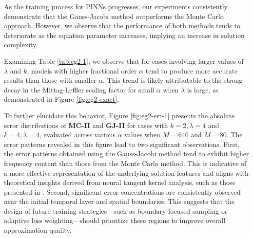 \documentclass[preprint,3p,times]{elsarticle}
\begin{document}
As the training process for PINNs progresses, our experiments consistently demonstrate that the Gauss-Jacobi method outperforms the Monte Carlo approach. However, we observe that the performance of both methods tends to deteriorate as the equation parameter increases, implying an increase in solution complexity.

Examining Table \ref{tab:eg2-1}, we observe that for cases involving larger values of $\lambda$ and $k$, models with higher fractional order $\alpha$ tend to produce more accurate results than those with smaller $\alpha$. This trend is likely attributable to the strong decay in the Mittag-Leffler scaling factor for small $\alpha$ when $\lambda$ is large, as demonstrated in Figure \ref{fig:eg2-exact}.

To further elucidate this behavior, Figure \ref{fig:eg2-err-1} presents the absolute error distributions of \textbf{MC-II} and \textbf{GJ-II} for cases with $k=2, \lambda=4$ and $k=4, \lambda=4$, evaluated across various $\alpha$ values when $M=640$ and $M=80$. The error patterns revealed in this figure lead to two significant observations. First, the error patterns obtained using the Gauss-Jacobi method tend to exhibit higher frequency content than those from the Monte Carlo method. This is indicative of a more effective representation of the underlying solution features and aligns with theoretical insights derived from neural tangent kernel analysis, such as those presented in \cite{WangYuParis:2022:NTK}. Second, significant error concentrations are consistently observed near the initial temporal layer and spatial boundaries. This suggests that the design of future training strategies—such as boundary-focused sampling or adaptive loss weighting—should prioritize these regions to improve overall approximation quality.
\end{document}
